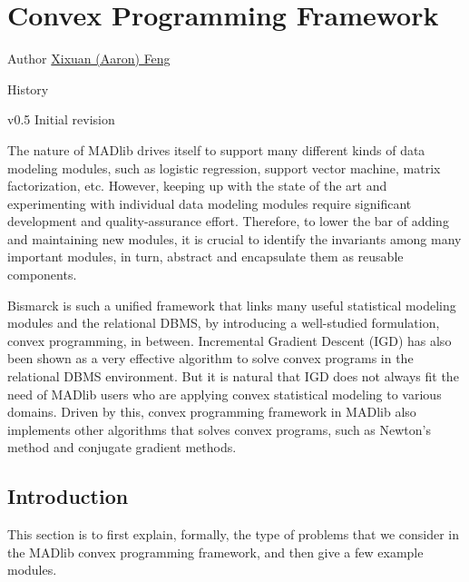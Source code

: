 
\chapter[Convex Programming Framework]{Convex Programming Framework}

\begin{moduleinfo}
\item[Author] \href{mailto:xfeng@cs.wisc.edu}{Xixuan (Aaron) Feng}
\item[History]
	\begin{modulehistory}
		\item[v0.5] Initial revision
	\end{modulehistory}
\end{moduleinfo}

The nature of MADlib drives itself to support many different kinds of data modeling modules, such as logistic regression, support vector machine, matrix factorization, etc.
However, keeping up with the state of the art and experimenting with individual data modeling modules require significant development and quality-assurance effort.
Therefore, to lower the bar of adding and maintaining new modules, it is crucial to identify the invariants among many important modules, in turn, abstract and encapsulate them as reusable components.

Bismarck \cite{DBLP:conf/sigmod/FengKRR12} is such a unified framework that links many useful statistical modeling modules and the relational DBMS, by introducing a well-studied formulation, convex programming, in between.
Incremental Gradient Descent (IGD) has also been shown as a very effective algorithm to solve convex programs in the relational DBMS environment.
But it is natural that IGD does not always fit the need of MADlib users who are applying convex statistical modeling to various domains.
Driven by this, convex programming framework in MADlib also implements other algorithms that solves convex programs, such as Newton's method and conjugate gradient methods.

\section{Introduction}
This section is to first explain, formally, the type of problems that we consider in the MADlib convex programming framework, and then give a few example modules.


